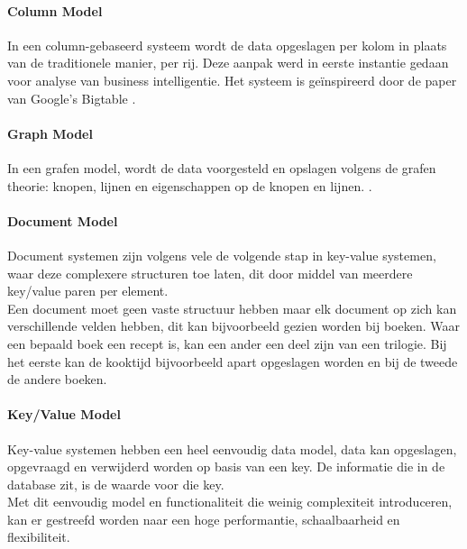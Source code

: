 \paragraph{Column Model}In een column-gebaseerd systeem wordt de data opgeslagen per kolom in plaats van de traditionele manier, per rij. Deze aanpak werd in eerste instantie gedaan voor analyse van business intelligentie. Het systeem is geïnspireerd door de paper van Google’s Bigtable \cite{chang2008bigtable}. \cite{Strauch.NoSQL}

\paragraph{Graph Model} In een grafen model, wordt de data voorgesteld en opslagen volgens de grafen theorie: knopen, lijnen en eigenschappen op de knopen en lijnen. \cite{bollacker2008freebase}.   

\paragraph{Document Model} Document systemen zijn volgens vele de volgende stap in key-value systemen, waar deze complexere structuren toe laten, dit door middel van meerdere key/value paren per element. \cite{Strauch.NoSQL} \\
Een document moet geen vaste structuur hebben maar elk document op zich kan verschillende velden hebben, dit kan bijvoorbeeld gezien worden bij boeken. Waar een bepaald boek een recept is, kan een ander een deel zijn van een trilogie. Bij het eerste kan de kooktijd bijvoorbeeld apart opgeslagen worden en bij de tweede de andere boeken. 

\paragraph{Key/Value Model} Key-value systemen hebben een heel eenvoudig data model, data kan opgeslagen, opgevraagd en verwijderd worden op basis van een key. De informatie die in de database zit, is de waarde voor die key. \\
Met dit eenvoudig model en functionaliteit die weinig complexiteit introduceren, kan er gestreefd worden naar een hoge performantie, schaalbaarheid en flexibiliteit. \cite{Strauch.NoSQL}

